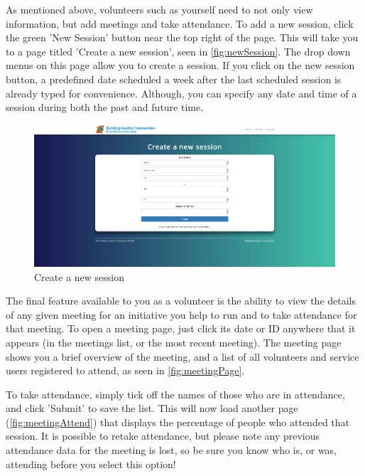 \documentclass{bhcguides}
\begin{document}
As mentioned above, volunteers such as yourself need to not only view information, but add meetings and take attendance. To add a new session, click the green 'New Session' button near the top right of the page. This will take you to a page titled 'Create a new session', seen in \autoref{fig:newSession}. The drop down menus on this page allow you to create a session. If you click on the new session button, a predefined date scheduled a week after the last scheduled session is already typed for convenience. Although, you can specify any date and time of a session during both the past and future time.

\begin{figure}[h]
 \centerline{\includegraphics[width=\textwidth, height=\textheight, keepaspectratio]{newsession.png}}
 \caption{Create a new session}
 \label{fig:newSession}
\end{figure}

\pagebreak

The final feature available to you as a volunteer is the ability to view the details of any given meeting for an initiative you help to run and to take attendance for that meeting. To open a meeting page, just click its date or ID anywhere that it appears (in the meetings list, or the most recent meeting). The meeting page shows you a brief overview of the meeting, and a list of all volunteers and service users registered to attend, as seen in \autoref{fig:meetingPage}.

To take attendance, simply tick off the names of those who are in attendance, and click 'Submit' to save the list. This will now load another page (\autoref{fig:meetingAttend}) that displays the percentage of people who attended that session. It is possible to retake attendance, but please note any previous attendance data for the meeting is lost, so be sure you know who is, or was, attending before you select this option!
\end{document}
